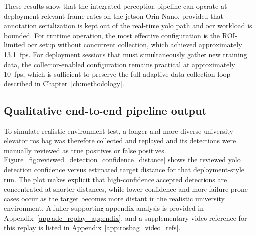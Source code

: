 \begin{table}[htbp]
    \centering
    \caption{Typical node timing ranges for the final \gls{ros} runtime experiments.}
    \label{tab:ros2_pipeline_timing}
    \small
\end{table}

These results show that the integrated perception pipeline can operate at
deployment-relevant frame rates on the \gls{jetson} Orin Nano, provided that annotation
serialization is kept out of the real-time \gls{yolo} path and \gls{ocr} workload is bounded.
For runtime operation, the most effective configuration is the ROI-limited \gls{ocr}
setup without concurrent collection, which achieved approximately 13.1~\gls{fps}.
For deployment sessions that must simultaneously gather new training data, the
collector-enabled configuration remains practical at approximately 10~\gls{fps},
which is sufficient to preserve the full adaptive data-collection loop described in
Chapter~\ref{ch:methodology}.


\subsection{Qualitative end-to-end pipeline output}

To simulate realistic environment test, a longer and more diverse university
elevator \gls{ros} bag was therefore collected and replayed and its detections were manually reviewed
as true positives or false positives. Figure~\ref{fig:reviewed_detection_confidence_distance}
shows the reviewed \gls{yolo} detection confidence versus estimated target distance for
that deployment-style run. The plot makes explicit that high-confidence accepted
detections are concentrated at shorter distances, while lower-confidence and more
failure-prone cases occur as the target becomes more distant in the realistic
university environment. A fuller supporting appendix analysis is provided in
Appendix~\ref{app:adc_replay_appendix}, and a supplementary video reference for
this replay is listed in Appendix~\ref{app:rosbag_video_refs}.

